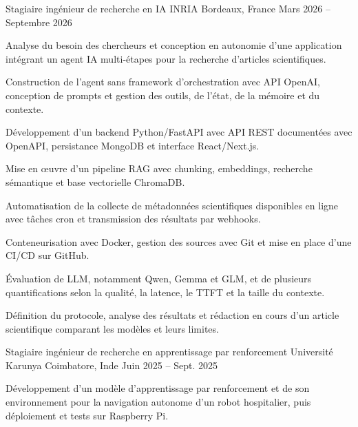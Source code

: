 
\begin{cventries}
  \cventry
    {Stagiaire ingénieur de recherche en IA}
    {INRIA}
    {Bordeaux, France}
    {Mars 2026 -- Septembre 2026}
    {
      \begin{cvitems}
        \item {Analyse du besoin des chercheurs et conception en autonomie d’une application intégrant un agent IA multi-étapes pour la recherche d’articles scientifiques.}
        \item {Construction de l’agent sans framework d’orchestration avec API OpenAI, conception de prompts et gestion des outils, de l’état, de la mémoire et du contexte.}
        \item {Développement d’un backend Python/FastAPI avec API REST documentées avec OpenAPI, persistance MongoDB et interface React/Next.js.}
        \item {Mise en œuvre d’un pipeline RAG avec chunking, embeddings, recherche sémantique et base vectorielle ChromaDB.}
        \item {Automatisation de la collecte de métadonnées scientifiques disponibles en ligne avec tâches cron et transmission des résultats par webhooks.}
        \item {Conteneurisation avec Docker, gestion des sources avec Git et mise en place d’une CI/CD sur GitHub.}
        \item {Évaluation de LLM, notamment Qwen, Gemma et GLM, et de plusieurs quantifications selon la qualité, la latence, le TTFT et la taille du contexte.}
        \item {Définition du protocole, analyse des résultats et rédaction en cours d’un article scientifique comparant les modèles et leurs limites.}
      \end{cvitems}
    }

  \cventry
    {Stagiaire ingénieur de recherche en apprentissage par renforcement}
    {Université Karunya}
    {Coimbatore, Inde}
    {Juin 2025 -- Sept. 2025}
    {
      \begin{cvitems}
        \item {Développement d’un modèle d’apprentissage par renforcement et de son environnement pour la navigation autonome d’un robot hospitalier, puis déploiement et tests sur Raspberry Pi.}
      \end{cvitems}
    }
\end{cventries}
